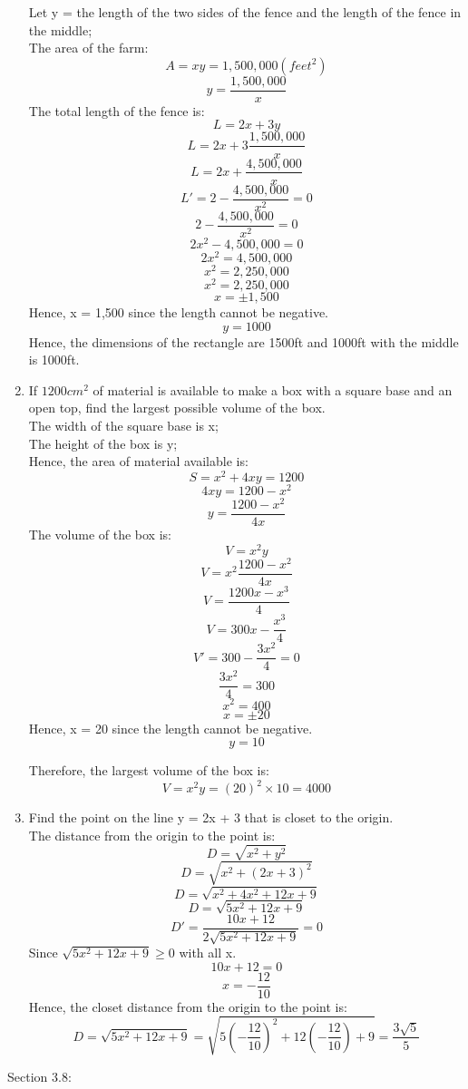 \documentclass[12pt]{article}
\begin{document}
\begin{enumerate}
    Let y = the length of the two sides of the fence and the length of the fence in the middle;\\
    The area of the farm:
    \[A = xy = 1,500,000 (feet^2)\]
    \[y = \frac{1,500,000}{x}\]
    The total length of the fence is:
    \[L = 2x + 3y\]
    \[L = 2x + 3\frac{1,500,000}{x}\]
    \[L = 2x + \frac{4,500,000}{x}\]
    \[L' = 2 - \frac{4,500,000}{x^2} = 0\]
    \[2 - \frac{4,500,000}{x^2} = 0\]
    \[2x^2 - 4,500,000 = 0\]
    \[2x^2 = 4,500,000\]
    \[x^2 = 2,250,000\]
    \[x^2 = 2,250,000\]
    \[x = \pm 1,500\]
    Hence, x = 1,500 since the length cannot be negative.
    \[y = 1000\]
    Hence, the dimensions of the rectangle are 1500ft and 1000ft with the middle is 1000ft.
    \setcounter{enumi}{18}
    \item If $1200cm^2$ of material is available to make a box with a square base and an open top, find the largest possible volume of the box.\\
    The width of the square base is x;\\
    The height of the box is y;\\
    Hence, the area of material available is:
    \[S = x^2 + 4xy = 1200\]
    \[4xy = 1200 - x^2\]
    \[y = \frac{1200 - x^2}{4x}\]
    The volume of the box is:
    \[V = x^2y\]
    \[V = x^2\frac{1200 - x^2}{4x}\] 
    \[V = \frac{1200x - x^3}{4}\] 
    \[V = 300x - \frac{x^3}{4}\] 
    \[V' = 300 - \frac{3x^2}{4} = 0\] 
    \[\frac{3x^2}{4} = 300\]
    \[x^2 = 400\]
    \[x = \pm 20\]
    Hence, x = 20 since the length cannot be negative.
    \[y = 10\]
    
    Therefore, the largest volume of the box is:
    \[V = x^2y = (20)^2 \times 10 = 4000\]
    \setcounter{enumi}{24}
    \newpage
    \item Find the point on the line y = 2x + 3 that is closet to the origin.\\
    The distance from the origin to the point is:
    \[D = \sqrt{x^2 + y^2}\]
    \[D = \sqrt{x^2 + (2x+3)^2}\]
    \[D = \sqrt{x^2 + 4x^2 + 12x + 9}\]
    \[D = \sqrt{5x^2 + 12x + 9}\]
    \[D' = \frac{10x + 12}{2\sqrt{5x^2 + 12x + 9}} = 0\]
    Since $\sqrt{5x^2 + 12x + 9} \geq 0$ with all x.
    \[10x + 12 = 0\]
    \[x = -\frac{12}{10}\]
    Hence, the closet distance from the origin to the point is:
    \[D = \sqrt{5x^2 + 12x + 9} = \sqrt{5(-\frac{12}{10})^2 + 12(-\frac{12}{10}) + 9} = \frac{3\sqrt{5}}{5}\]
\end{enumerate}
Section 3.8:
\end{document}
